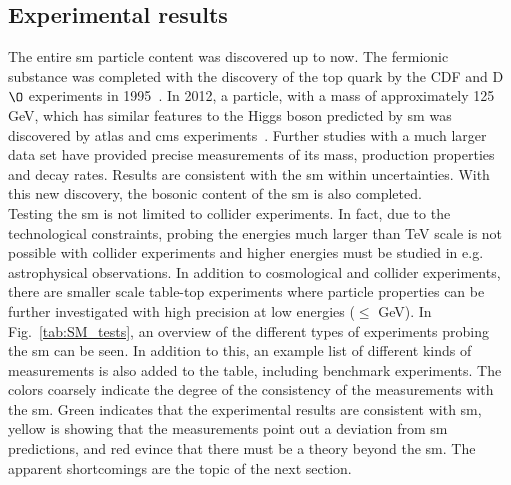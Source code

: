 

\subsection{Experimental results}
\label{sec:StandardModelExp}

The entire \acrshort{sm} particle content was discovered up to now. The fermionic substance was completed with the discovery of the top quark by the CDF and D$\O$ experiments in 1995~\cite{top1,top2}. In 2012, a particle, with a mass of approximately 125 GeV, which has similar features to the Higgs boson predicted by \acrshort{sm} was discovered by \acrshort{atlas} and \acrshort{cms} experiments~\cite{higgsexp1,higgsexp2,higgsexp3}. Further studies with a much larger data set have provided precise measurements of its mass, production properties and decay rates. Results are consistent with the \acrshort{sm} within uncertainties. With this new discovery, the bosonic content of the \acrshort{sm} is also completed.\\
Testing the \acrshort{sm} is not limited to collider experiments. In fact, due to the technological constraints, probing the energies much larger than TeV scale is not possible with collider experiments and higher energies must be studied in e.g. astrophysical observations. In addition to cosmological and collider experiments, there are smaller scale table-top experiments where particle properties can be further investigated with high precision at low energies ($\leq$ GeV).
In Fig.~\ref{tab:SM_tests}, an overview of the different types of experiments probing the \acrshort{sm} can be seen. In addition to this, an example list of different kinds of measurements is also added to the table, including benchmark experiments. The colors coarsely indicate the degree of the consistency of the measurements with the \acrshort{sm}. Green indicates that the experimental results are consistent with \acrshort{sm}, yellow is showing that the measurements point out a deviation from \acrshort{sm} predictions, and red evince that there must be a theory beyond the \acrshort{sm}. The apparent shortcomings are the topic of the next section.
